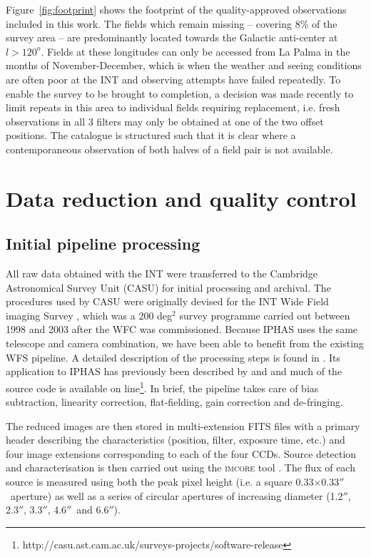 \documentclass[useAMS,usenatbib]{mn2e}
\def\arcsec{$''$}
\begin{document}
Figure~\ref{fig:footprint} shows the footprint 
of the quality-approved observations included in this work. 
The fields which remain missing 
-- covering 8\% of the survey area --
are predominantly located towards the Galactic anti-center 
at $l > 120^o$.
Fields at these longitudes can only be accessed from La Palma 
in the months of November-December,
which is when the weather and seeing conditions are often poor
at the INT and observing attempts have failed repeatedly.
To enable the survey to be brought to completion, 
a decision was made recently to limit repeats in this area 
to individual fields requiring replacement,
i.e. fresh observations in all 3 filters may only be obtained 
at one of the two offset positions.  
The catalogue is structured such that it is clear 
where a contemporaneous observation of both halves of a field pair
is not available.


\section{Data reduction and quality control}
\label{sec:reduction}

\subsection{Initial pipeline processing}

All raw data obtained with the INT were transferred
to the Cambridge Astronomical Survey Unit (CASU) 
for initial processing and archival.
The procedures used by CASU were originally devised
for the INT Wide Field imaging Survey \citep[WFS;][]{McMahon2001,Irwin2005},
which was a 200 deg$^2$ survey programme carried out 
between 1998 and 2003 after the WFC was commissioned.
Because IPHAS uses the same telescope and camera combination,
we have been able to benefit from the existing WFS pipeline.
A detailed description of the processing steps 
is found in \citet{Irwin2001}.
Its application to IPHAS has previously been described
by \citet{Drew2005} and \citet{Gonzalez-Solares2008}
and much of the source code is available 
on line\footnote{http://casu.ast.cam.ac.uk/surveys-projects/software-release}. 
In brief, the pipeline takes care of bias subtraction,
linearity correction, flat-fielding,
gain correction and de-fringing.

The reduced images are then stored in multi-extension FITS files
with a primary header describing the characteristics
(position, filter, exposure time, etc.) 
and four image extensions 
corresponding to each of the four CCDs.
Source detection and characterisation is then carried out 
using the \textsc{imcore} tool \citep{Irwin1985,Irwin1997}.
The flux of each source is measured using both
the peak pixel height (i.e. a square 0.33$\times$0.33\arcsec\ aperture)
as well as a series of circular apertures of increasing diameter 
(1.2\arcsec, 2.3\arcsec, 3.3\arcsec, 4.6\arcsec\ and 6.6\arcsec).
\end{document}
